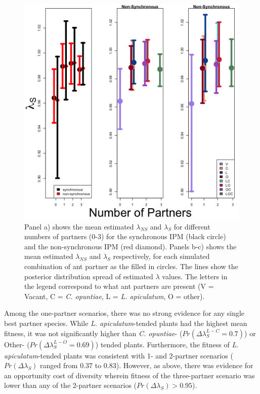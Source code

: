 \documentclass[11pt]{article}
\begin{document}
\begin{figure}
	\includegraphics[width=0.91\linewidth]{Figures/Lambdas_Comp_lines.png}
	\caption{Panel a) shows the mean estimated $\lambda_{NS}$ and $\lambda_{S}$ for different numbers of partners (0-3) for the synchronous IPM (black circle) and the non-synchronous IPM (red diamond). Panels b-c) shows the mean estimated $\lambda_{NS}$ and $\lambda_{S}$ respectively, for each simulated combination of ant partner as the filled in circles. The lines show the posterior distribution spread of estimated $\lambda$ values. The letters in the legend correspond to what ant partners are present (V = Vacant, C = \textit{C. opuntiae}, L = \textit{L. apiculatum}, O = other). }
	\label{fig:LambdaMeans}
\end{figure}

Among the one-partner scenarios, there was no strong evidence for any single best partner species. 
While \textit{L. apiculatum}-tended plants had the highest mean fitness, it was not significantly higher than \textit{C. opuntiae}-  ($Pr(\Delta\lambda^{L-C}_{S}=0.7)$) or Other- ($Pr(\Delta\lambda^{L-O}_{S}=0.69)$) tended plants. 
Furthermore, the fitness of \textit{L. apiculatum}-tended plants was consistent with 1- and 2-partner scenarios ($Pr(\Delta\lambda_{S})$ ranged from 0.37 to 0.83).
However, as above, there was evidence for an opportunity cost of diversity wherein fitness of the three-partner scenario was lower than any of the 2-partner scenarios ($Pr(\Delta\lambda_{S})>0.95$). 
\end{document}

